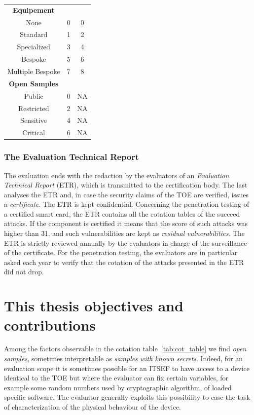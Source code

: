 \begin{table}[]
\begin{tabular}{ccc}
\midrule
\textbf{Equipement}           &                &              \\
None                          & 0              & 0            \\
Standard                      & 1              & 2            \\
Specialized                   & 3              & 4            \\
Bespoke                       & 5              & 6            \\
Multiple Bespoke              & 7              & 8            \\
\midrule
\textbf{Open Samples}         &                &              \\
Public                        & 0              & NA           \\
Restricted                    & 2              & NA           \\
Sensitive                     & 4              & NA           \\
Critical                      & 6              & NA    \\	
\bottomrule      
\end{tabular}
\end{table}


\subsubsection{The Evaluation Technical Report}
The evaluation ends with the redaction by the evaluators of an \emph{Evaluation Technical Report} (ETR), which is transmitted to the certification body. The last analyses the ETR and, in case the security claims of the TOE are verified, issues a \emph{certificate}. The ETR is kept confidential. Concerning the penetration testing of a certified smart card, the ETR contains all the cotation tables of the succeed attacks. If the component is certified it means that the score of such attacks was higher than 31, and such vulnerabilities are kept as \emph{residual vulnerabilities}. The ETR is strictly reviewed annually by the evaluators in charge of the surveillance of the certificate. For the penetration testing, the evaluators are in particular asked each year to verify that the cotation of the attacks presented in the ETR did not drop.

\section{This thesis objectives and contributions}\label{sec:this_thesis_objectives}
Among the factors observable in the cotation table~\ref{tab:cot_table} we find \emph{open samples}, sometimes interpretable as \emph{samples with known secrets}. Indeed, for an evaluation scope it is sometimes possible for an ITSEF to have access to a device identical to the TOE but where the evaluator can fix certain variables, for example some random numbers used by cryptographic algorithm, of loaded specific software. The evaluator generally exploits this possibility to ease the task of characterization of the physical behaviour of the device.\\

